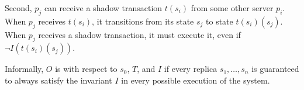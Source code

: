 Second, $p_j$ can receive a shadow transaction $t(s_i)$ from some other server
$p_i$. When $p_j$ receives $t(s_i)$, it transitions from its state $s_j$ to
state $t(s_i)(s_j)$. When $p_j$ receives a shadow transaction, it must execute
it, even if $\lnot I(t(s_i)(s_j))$.

Informally, $O$ is \invariantconfluent{} with respect to $s_0$, $T$, and $I$ if
every replica $s_1, \ldots, s_n$ is guaranteed to always satisfy the invariant
$I$ in every possible execution of the system.

%
% 
%
%
%
%
%

